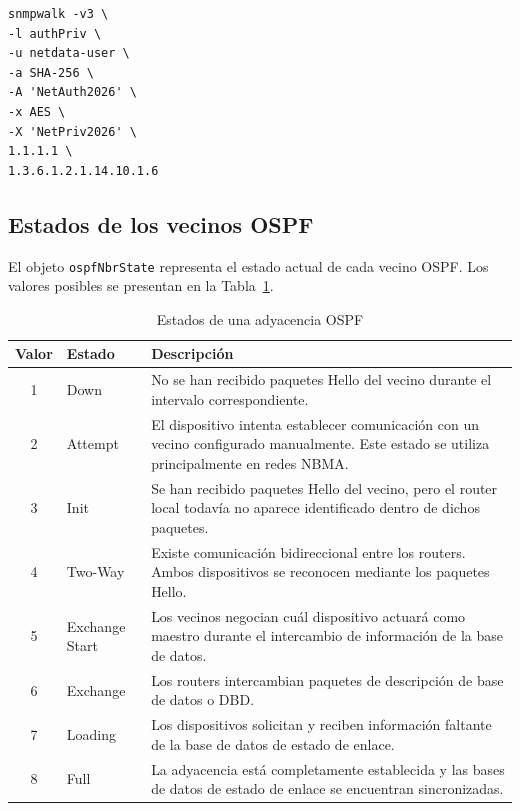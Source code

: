 \begin{lstlisting}[style=terminal]
snmpwalk -v3 \
-l authPriv \
-u netdata-user \
-a SHA-256 \
-A 'NetAuth2026' \
-x AES \
-X 'NetPriv2026' \
1.1.1.1 \
1.3.6.1.2.1.14.10.1.6
\end{lstlisting}

\subsection{Estados de los vecinos OSPF}

El objeto \texttt{ospfNbrState} representa el estado actual de cada vecino OSPF. Los valores posibles se presentan en la Tabla~\ref{tab:estados-ospf}.

\begin{table}[H]
\centering
\caption{Estados de una adyacencia OSPF}
\label{tab:estados-ospf}
\begin{tabular}{c|l|p{8cm}}
\hline
\textbf{Valor} & \textbf{Estado} & \textbf{Descripción} \\ \hline

1 & Down &
No se han recibido paquetes Hello del vecino durante el intervalo correspondiente. \\ \hline

2 & Attempt &
El dispositivo intenta establecer comunicación con un vecino configurado manualmente. Este estado se utiliza principalmente en redes NBMA. \\ \hline

3 & Init &
Se han recibido paquetes Hello del vecino, pero el router local todavía no aparece identificado dentro de dichos paquetes. \\ \hline

4 & Two-Way &
Existe comunicación bidireccional entre los routers. Ambos dispositivos se reconocen mediante los paquetes Hello. \\ \hline

5 & Exchange Start &
Los vecinos negocian cuál dispositivo actuará como maestro durante el intercambio de información de la base de datos. \\ \hline

6 & Exchange &
Los routers intercambian paquetes de descripción de base de datos o DBD. \\ \hline

7 & Loading &
Los dispositivos solicitan y reciben información faltante de la base de datos de estado de enlace. \\ \hline

8 & Full &
La adyacencia está completamente establecida y las bases de datos de estado de enlace se encuentran sincronizadas. \\ \hline

\end{tabular}
\end{table}

